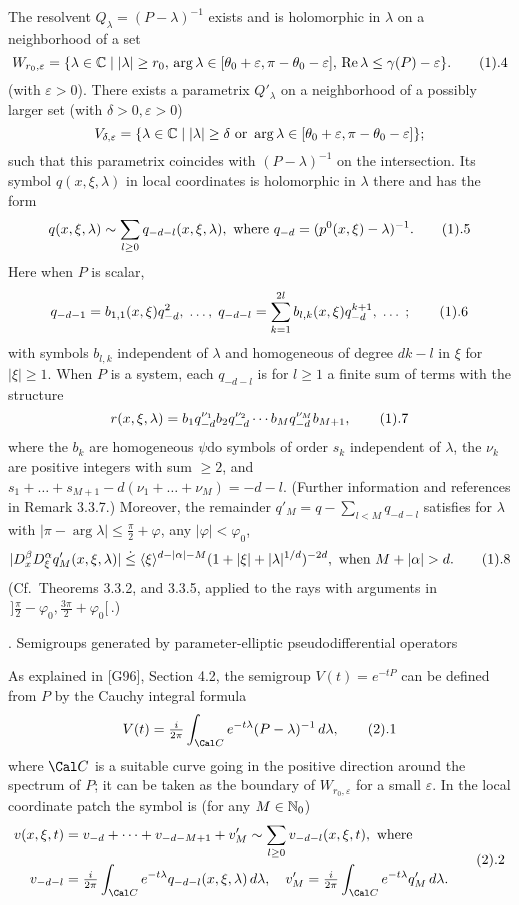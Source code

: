 The resolvent $Q_\lambda =(P-\lambda )^{-1}$ exists and is holomorphic in
$\lambda $ on a neighborhood of a set
$$
W_{r_0,\varepsilon }=\{\lambda \in{\Bbb C}\mid |\lambda |\ge r_0,\,
\arg \lambda \in [\theta _0+\varepsilon , \pi -\theta _0-\varepsilon
],\, \operatorname{Re}\lambda \le \gamma (P)-\varepsilon \}.\tag1.4
$$
(with  $\varepsilon >0$).
There
exists a parametrix $Q'_\lambda $
on a neighborhood of a possibly larger set (with $\delta >0,\varepsilon >0$)
$$
V_{\delta ,\varepsilon }=\{\lambda \in{\Bbb C}\mid |\lambda |\ge
\delta \text{ or }
\arg \lambda \in [\theta _0+\varepsilon , \pi -\theta _0-\varepsilon
] \};
$$
such that this parametrix coincides with $(P-\lambda )^{-1}$ on
the intersection. Its symbol $q(x,\xi ,\lambda )$ in local coordinates
is holomorphic in $\lambda $ there and has the form
$$
q(x,\xi,\lambda )\sim \sum_{l\ge 0}q_{-d-l}(x,\xi,\lambda )
,\text{ where }
q_{-d}=({p^0(x,\xi)-\lambda })^{-1}.\tag1.5
$$
Here when $P$ is scalar,
$$
 q_{-d-1}={b_{1,1}(x,\xi
)}q_{-d}^{2},\; \dots,\;
q_{-d-l}=\sum_{k=1}^{2l}{b_{l,k}(x,\xi)}{q_{-d}^{k+1}},\; \dots\; ;
\tag1.6$$
with symbols $b_{l,k}$  independent of $\lambda $ and homogeneous of
degree   $dk-l$ in $\xi$ for $|\xi|\ge 1$. When $P$ is a system, each
 $q_{-d-l}$ is for $l\ge 1$ a finite sum of terms with the structure
$$ r(x,\xi ,\lambda )=b_1q_{-d}^{\nu _1}b_2q_{-d}^{\nu _2}\cdots b_Mq_{-d}^{\nu _M}b_{M+1},\tag1.7
$$
where the $b_k$ are homogeneous $\psi $do symbols of order $s_k$ independent of
$\lambda $, the $\nu _k$ are positive integers with sum $\ge 2$, and
$s_1+\dots +s_{M+1}-d(\nu _1+\dots+\nu _M)=-d-l$. (Further information
and references in Remark 3.3.7.)
Moreover, the remainder
$q'_M=q-\sum_{l<M}q_{-d-l}$ satisfies for $\lambda $ with $|\pi
-\arg\lambda |\le\frac\pi 2+\varphi $, any $|\varphi |<\varphi _0$,
$$
|D_{x}^\beta D_{\xi}^\alpha q'_M(x,\xi,\lambda )|\leg \ang{\xi
}^{d-|\alpha |-M}(1+|\xi|+|\lambda |^{1/d})^{-2d}, \text{ when }M+|\alpha |>d
.\tag1.8$$
(Cf.\ Theorems 3.3.2, and 3.3.5, applied to the rays with arguments in
$\,]\frac\pi 2-\varphi _0,\frac{3\pi }2+\varphi _0[\,$.)

. Semigroups generated by parameter-elliptic pseudodifferential
operators \endhead


 As explained in [G96], Section 4.2, the semigroup $V(t)=e^{-tP }$ can be defined from $P $ by the
 Cauchy integral formula
$$
V(t)=\tfrac i {2\pi }\int_{\Cal C}e^{-t\lambda }(P -\lambda )^{-1}\,d\lambda ,\tag2.1
$$
where $\Cal C$ is a suitable curve going in the positive direction
around the spectrum of
$P $; it can be taken as the boundary of $W_{r_0,\varepsilon }$ for a
small $\varepsilon $.
 In the local coordinate patch
 the symbol is (for any $M\in{\Bbb N}_0$)
$$
\aligned
v(x,\xi,t)&=
v_{-d}+\dots+v_{-d-M+1}+v'_M\sim \sum_{l\ge 0}v_{-d-l}(x,\xi
,t),\text{ where }\\
v_{-d-l}&=\tfrac i {2\pi }\int_{\Cal C }e^{-t\lambda }q_{-d-l}(x,\xi
,\lambda )\,d\lambda,\quad v'_{M}=\tfrac i {2\pi }\int_{\Cal C }e^{-t\lambda }q'_{M}\,d\lambda.
\endaligned
 \tag2.2
$$

